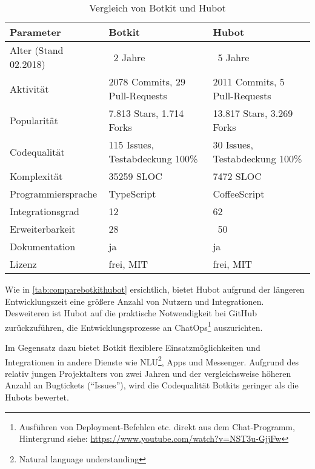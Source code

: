 \begin{table}[htbp]
    \centering
    \begin{tabularx}{\textwidth}{lXX}
        \hline
        \textbf{Parameter} & \textbf{Botkit} & \textbf{Hubot} \\
        \hline
        Alter (Stand 02.2018) & ~2 Jahre & ~5 Jahre \\
        \hline
        Aktivität & 2078 Commits, 29 Pull-Requests & 2011 Commits, 5 Pull-Requests \\
        \hline
        Popularität & 7.813 Stars, 1.714 Forks & 13.817 Stars, 3.269 Forks \\
        \hline
        Codequalität & 115 Issues, Testabdeckung 100\% & 30 Issues, Testabdeckung 100\% \\
        \hline
        Komplexität & 35259 SLOC & 7472 SLOC \\
        \hline
        Programmiersprache & TypeScript & CoffeeScript \\
        \hline
        Integrationsgrad & 12 & 62 \\
        \hline
        Erweiterbarkeit & 28 & ~50 \\
        \hline
        Dokumentation & ja & ja \\
        \hline
        Lizenz & frei, MIT & frei, MIT \\
    \end{tabularx}
    \caption{Vergleich von Botkit und Hubot}
    \label{tab:comparebotkithubot}
\end{table}


Wie in \autoref{tab:comparebotkithubot} ersichtlich, bietet Hubot aufgrund der längeren Entwicklungszeit eine größere Anzahl von Nutzern und Integrationen. Desweiteren ist Hubot auf die praktische Notwendigkeit bei GitHub zurückzuführen, die Entwicklungsprozesse an ChatOps\footnote{Ausführen von Deployment-Befehlen etc. direkt aus dem Chat-Programm, Hintergrund siehe: \url{https://www.youtube.com/watch?v=NST3u-GjjFw}} auszurichten.

Im Gegensatz dazu bietet Botkit flexiblere Einsatzmöglichkeiten und Integrationen in andere Dienste wie NLU\footnote{Natural language understanding}, Apps und Messenger. Aufgrund des relativ jungen Projektalters von zwei Jahren und der vergleichsweise höheren Anzahl an Bugtickets (\enquote{Issues}), wird die Codequalität Botkits geringer als die Hubots bewertet.

